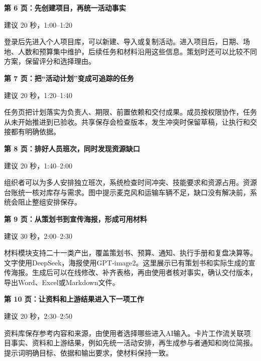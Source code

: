 \documentclass[UTF8,fontset=windows,zihao=-4,a4paper]{ctexart}
\begin{document}
{\large\bfseries\color{ink}第 6 页：先创建项目，再统一活动事实}\par
{\small\color{gray}建议 20 秒，1:00–1:20}\par
登录后先进入个人项目库，可以新建、导入或复制活动。进入项目后，日期、场地、人数和预算集中维护，后续任务和材料沿用这些信息。策划时还可以比较不同方案，保留评分和选择理由。\par\vspace{8pt}

{\large\bfseries\color{ink}第 7 页：把“活动计划”变成可追踪的任务}\par
{\small\color{gray}建议 20 秒，1:20–1:40}\par
任务页把计划落实为负责人、期限、前置依赖和交付成果。成员按权限协作，任务从未开始推进到已验收。共享保存会检查版本，发生冲突时保留草稿，让执行和交接都有明确依据。\par\vspace{8pt}

{\large\bfseries\color{ink}第 8 页：排好人员班次，同时发现资源缺口}\par
{\small\color{gray}建议 20 秒，1:40–2:00}\par
组织者可以为多人安排独立班次，系统检查时间冲突、技能要求和资源占用。资源台账统一核对库存与需求。图中提示麦克风和运输车辆不足，缺口没有解决前，系统会阻止整组安排保存。\par\vspace{8pt}

{\large\bfseries\color{ink}第 9 页：从策划书到宣传海报，形成可用材料}\par
{\small\color{gray}建议 30 秒，2:00–2:30}\par
材料模块支持二十一类产出，覆盖策划书、预算、通知、执行手册和复盘决算等。文字使用DeepSeek，海报使用GPT-image2。这里展示已有策划书和实际生成的宣传海报。生成后可以在线修改、补齐表格，再由使用者核对事实，确认交付版本，导出Word、Excel或Markdown文件。\par\vspace{8pt}

{\large\bfseries\color{ink}第 10 页：让资料和上游结果进入下一项工作}\par
{\small\color{gray}建议 20 秒，2:30–2:50}\par
资料库保存参考内容和来源，由使用者选择哪些进入AI输入。卡片工作流关联项目事实、资料和上游结果，例如先统一活动安排，再生成参与者通知和岗位简报。提示词明确目标、依据和输出要求，使材料保持一致。\par\vspace{8pt}
\end{document}
